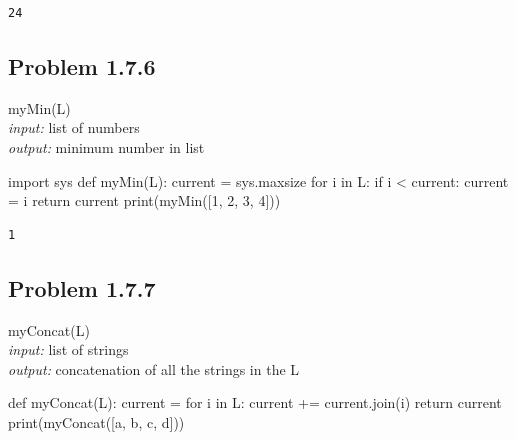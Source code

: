 \documentclass[
  letterpaper,
  DIV=11,
  numbers=noendperiod]{scrartcl}
\newenvironment{Shaded}{\begin{snugshade}}{\end{snugshade}}
\newcommand{\BuiltInTok}[1]{\textcolor[rgb]{0.00,0.23,0.31}{#1}}
\newcommand{\ControlFlowTok}[1]{\textcolor[rgb]{0.00,0.23,0.31}{#1}}
\newcommand{\DecValTok}[1]{\textcolor[rgb]{0.68,0.00,0.00}{#1}}
\newcommand{\ImportTok}[1]{\textcolor[rgb]{0.00,0.46,0.62}{#1}}
\newcommand{\KeywordTok}[1]{\textcolor[rgb]{0.00,0.23,0.31}{#1}}
\newcommand{\NormalTok}[1]{\textcolor[rgb]{0.00,0.23,0.31}{#1}}
\newcommand{\OperatorTok}[1]{\textcolor[rgb]{0.37,0.37,0.37}{#1}}
\newcommand{\StringTok}[1]{\textcolor[rgb]{0.13,0.47,0.30}{#1}}
\begin{document}
\begin{verbatim}
24
\end{verbatim}

\hypertarget{problem-1.7.6}{%
\subsection{Problem 1.7.6}\label{problem-1.7.6}}

myMin(L)\\
\emph{input:} list of numbers\\
\emph{output:} minimum number in list

\begin{Shaded}
\begin{Highlighting}[numbers=left,,]
\ImportTok{import}\NormalTok{ sys}
\KeywordTok{def}\NormalTok{ myMin(L):}
\NormalTok{    current }\OperatorTok{=}\NormalTok{ sys.maxsize}
    \ControlFlowTok{for}\NormalTok{ i }\KeywordTok{in}\NormalTok{ L:}
        \ControlFlowTok{if}\NormalTok{ i }\OperatorTok{\textless{}}\NormalTok{ current:}
\NormalTok{            current }\OperatorTok{=}\NormalTok{ i}
    \ControlFlowTok{return}\NormalTok{ current}
\BuiltInTok{print}\NormalTok{(myMin([}\DecValTok{1}\NormalTok{, }\DecValTok{2}\NormalTok{, }\DecValTok{3}\NormalTok{, }\DecValTok{4}\NormalTok{]))}
\end{Highlighting}
\end{Shaded}

\begin{verbatim}
1
\end{verbatim}

\hypertarget{problem-1.7.7}{%
\subsection{Problem 1.7.7}\label{problem-1.7.7}}

myConcat(L)\\
\emph{input:} list of strings\\
\emph{output:} concatenation of all the strings in the L

\begin{Shaded}
\begin{Highlighting}[numbers=left,,]
\KeywordTok{def}\NormalTok{ myConcat(L): }
\NormalTok{    current }\OperatorTok{=} \StringTok{\textquotesingle{}\textquotesingle{}}
    \ControlFlowTok{for}\NormalTok{ i }\KeywordTok{in}\NormalTok{ L:}
\NormalTok{        current }\OperatorTok{+=}\NormalTok{ current.join(i)}
    \ControlFlowTok{return}\NormalTok{ current}
\BuiltInTok{print}\NormalTok{(myConcat([}\StringTok{\textquotesingle{}a\textquotesingle{}}\NormalTok{, }\StringTok{\textquotesingle{}b\textquotesingle{}}\NormalTok{, }\StringTok{\textquotesingle{}c\textquotesingle{}}\NormalTok{, }\StringTok{\textquotesingle{}d\textquotesingle{}}\NormalTok{]))}
\end{Highlighting}
\end{Shaded}
\end{document}
